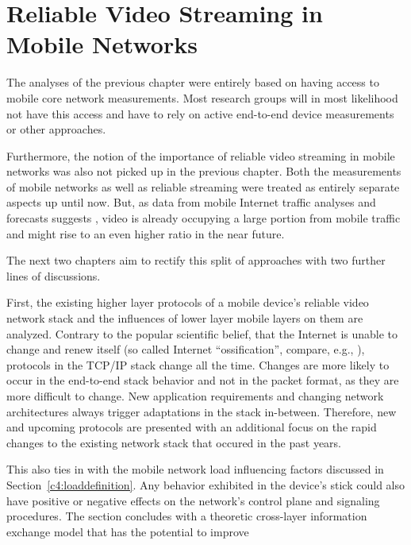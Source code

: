 \chapter{Reliable Video Streaming in Mobile Networks}
\label{chap:mobilestreaming}

The analyses of the previous chapter were entirely based on having access to mobile core network measurements. Most research groups will in most likelihood not have this access and have to rely on active end-to-end device measurements or other approaches.

Furthermore, the notion of the importance of reliable video streaming in mobile networks was also not picked up in the previous chapter. Both the measurements of mobile networks as well as reliable streaming were treated as entirely separate aspects up until now. But, as data from mobile Internet traffic analyses and forecasts suggests \cite{cisco2014VNI}, video is already occupying a large portion from mobile traffic and might rise to an even higher ratio in the near future.

The next two chapters aim to rectify this split of approaches with two further lines of discussions. 

First, the existing higher layer protocols of a mobile device's reliable video network stack and the influences of lower layer mobile layers on them are analyzed. Contrary to the popular scientific belief, that the Internet is unable to change and renew itself (so called Internet ``ossification'', compare, e.g., \cite{feldmann2010ossification}), protocols in the \gls{TCP}/\gls{IP} stack change all the time. Changes are more likely to occur in the end-to-end stack behavior and not in the packet format, as they are more difficult to change. New application requirements and changing network architectures always trigger adaptations in the stack in-between. Therefore, new and upcoming protocols are presented with an additional focus on the rapid changes to the existing network stack that occured in the past years.

This also ties in with the mobile network load influencing factors discussed in Section~\ref{c4:loaddefinition}. Any behavior exhibited in the device's stick could also have positive or negative effects on the network's control plane and signaling procedures. The section concludes with a theoretic cross-layer information exchange model that has the potential to improve 

